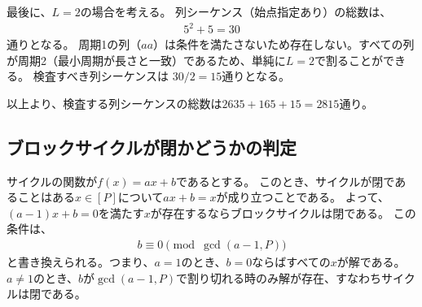 \documentclass[a4paper,11pt,dvipdfmx]{jsarticle}
\theoremstyle{definition}
\begin{document}
最後に、$L=2$の場合を考える。
列シーケンス（始点指定あり）の総数は、
\begin{align}
  5^2 + 5 = 30
\end{align}
通りとなる。
周期1の列（$aa$）は条件を満たさないため存在しない。すべての列が周期2（最小周期が長さと一致）であるため、単純に$L=2$で割ることができる。
検査すべき列シーケンスは $30/2 = 15$通りとなる。

以上より、検査する列シーケンスの総数は$2635+165+15=2815$通り。

\subsection{ブロックサイクルが閉かどうかの判定}\label{ssec:is_cbc}
サイクルの関数が$f(x)=ax+b$であるとする。
このとき、サイクルが閉であることはある$x\in[P]$について$ax+b = x$が成り立つことである。
よって、$(a-1)x+b=0$を満たす$x$が存在するならブロックサイクルは閉である。
この条件は、
\begin{align}
  b \equiv 0 \pmod{\gcd(a-1, P)}\label{eq:cbc}
\end{align}
と書き換えられる。つまり、$a=1$のとき、$b=0$ならばすべての$x$が解である。
$a\neq 1$のとき、$b$が$\gcd(a-1, P)$で割り切れる時のみ解が存在、すなわちサイクルは閉である。
\end{document}
